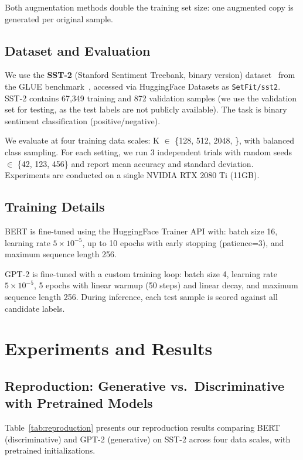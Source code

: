 \documentclass[11pt,a4paper]{article}
\begin{document}
Both augmentation methods double the training set size: one augmented copy is generated per original sample.

\subsection{Dataset and Evaluation}

We use the \textbf{SST-2} (Stanford Sentiment Treebank, binary version) dataset~\cite{socher2013recursive} from the GLUE benchmark~\cite{wang2018glue}, accessed via HuggingFace Datasets as \texttt{SetFit/sst2}. SST-2 contains 67,349 training and 872 validation samples (we use the validation set for testing, as the test labels are not publicly available). The task is binary sentiment classification (positive/negative).

We evaluate at four training data scales: K $\in$ \{128, 512, 2048, \}, with balanced class sampling. For each setting, we run 3 independent trials with random seeds $\in$ \{42, 123, 456\} and report mean accuracy and standard deviation. Experiments are conducted on a single NVIDIA RTX 2080 Ti (11GB).

\subsection{Training Details}

BERT is fine-tuned using the HuggingFace Trainer API with: batch size 16, learning rate $5\times10^{-5}$, up to 10 epochs with early stopping (patience=3), and maximum sequence length 256.

GPT-2 is fine-tuned with a custom training loop: batch size 4, learning rate $5\times10^{-5}$, 5 epochs with linear warmup (50 steps) and linear decay, and maximum sequence length 256. During inference, each test sample is scored against all candidate labels.

\section{Experiments and Results}

\subsection{Reproduction: Generative vs.\ Discriminative with Pretrained Models}

Table~\ref{tab:reproduction} presents our reproduction results comparing BERT (discriminative) and GPT-2 (generative) on SST-2 across four data scales, with pretrained initializations.
\end{document}
